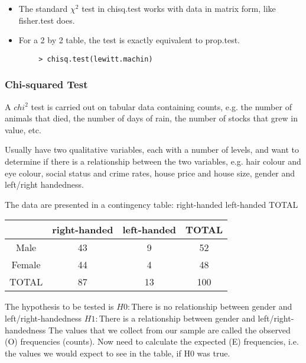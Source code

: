 \documentclass[a4paper,12pt]{article}
\begin{document}
\begin{itemize}
		
		\begin{itemize}
			\item The standard $\chi^{2}$ test  in chisq.test works with data in matrix form, like fisher.test does.
			\item For a 2 by 2 table, the test is exactly equivalent to prop.test.
		\end{itemize}
		
		
		\large \begin{verbatim}
		> chisq.test(lewitt.machin)
		\end{verbatim}\large
		
		
		
		\subsubsection{Chi-squared Test}
		
		A $chi^2$ test is carried out on tabular data containing counts, e.g. the
		number of animals that died, the number of days of rain, the
		number of stocks that grew in value, etc.
		
		Usually have two qualitative variables, each with a number of
		levels, and want to determine if there is a relationship between the
		two variables, e.g. hair colour and eye colour, social status and
		crime rates, house price and house size, gender and left/right
		handedness.
		
		The data are presented in a contingency table:
		right-handed left-handed TOTAL
		
		\begin{tabular}{|c|c|c|c|}
			\hline
			& right-handed &left-handed & TOTAL\\\hline
			Male & 43 & 9 & 52 \\
			Female & 44 & 4 & 48 \\
			TOTAL & 87 & 13 & 100 \\
			\hline
		\end{tabular}
		
		
		The hypothesis to be tested is
		$H0 :$There is no relationship between gender and left/right-handedness
		$H1 :$There is a relationship between gender and left/right-handedness
		The values that we collect from our sample are called the observed
		(O) frequencies (counts). Now need to calculate the expected (E)
		frequencies, i.e. the values we would expect to see in the table, if
		H0 was true.
		

\end{itemize}
\end{document}
